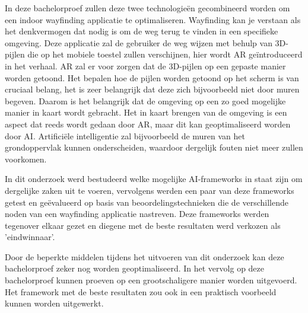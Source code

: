 In deze bachelorproef zullen deze twee technologieën gecombineerd worden om een indoor wayfinding applicatie te optimaliseren. Wayfinding kan je verstaan als het denkvermogen dat nodig is om de weg terug te vinden in een specifieke omgeving. Deze applicatie zal de gebruiker de weg wijzen met behulp van 3D-pijlen die op het mobiele toestel zullen verschijnen, hier wordt AR geïntroduceerd in het verhaal. AR zal er voor zorgen dat de 3D-pijlen op een gepaste manier worden getoond. Het bepalen hoe de pijlen worden getoond op het scherm is van cruciaal belang, het is zeer belangrijk dat deze zich bijvoorbeeld niet door muren begeven. Daarom is het belangrijk dat de omgeving op een zo goed mogelijke manier in kaart wordt gebracht. Het in kaart brengen van de omgeving is een aspect dat reeds wordt gedaan door AR, maar dit kan geoptimaliseerd worden door AI. Artificiële intelligentie zal bijvoorbeeld de muren van het grondoppervlak kunnen onderscheiden, waardoor dergelijk fouten niet meer zullen voorkomen.

In dit onderzoek werd bestudeerd welke mogelijke AI-frameworks in staat zijn om dergelijke zaken uit te voeren, vervolgens werden een paar van deze frameworks getest en geëvalueerd op basis van beoordelingstechnieken die de verschillende noden van een wayfinding applicatie nastreven. Deze frameworks werden tegenover elkaar gezet en diegene met de beste resultaten werd verkozen als 'eindwinnaar'.

Door de beperkte middelen tijdens het uitvoeren van dit onderzoek kan deze bachelorproef zeker nog worden geoptimaliseerd. In het vervolg op deze bachelorproef kunnen proeven op een grootschaligere manier worden uitgevoerd. Het framework met de beste resultaten zou ook in een praktisch voorbeeld kunnen worden uitgewerkt.

